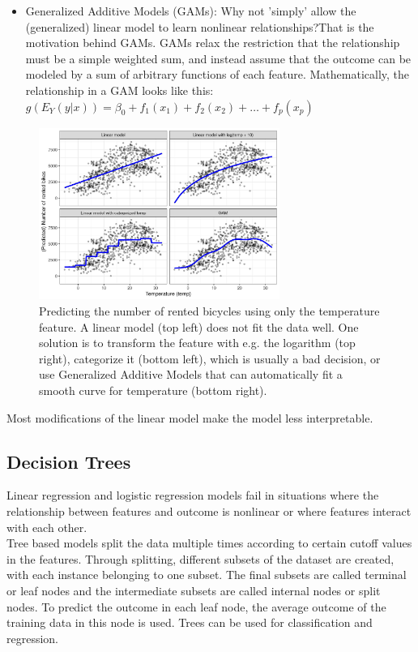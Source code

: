\begin{enumerate}
\begin{itemize}
        \item Generalized Additive Models (GAMs): Why not 'simply' allow the (generalized) linear model to learn nonlinear relationships?That is the motivation behind GAMs. GAMs relax the restriction that the relationship must be a simple weighted sum, and instead assume that the outcome can be modeled by a sum of arbitrary functions of each feature. Mathematically, the relationship in a GAM looks like this: $g(E_Y(y|x))=\beta_0+f_1(x_{1})+f_2(x_{2})+\ldots+f_p(x_{p})$
    \end{itemize}
\end{enumerate}

\begin{figure}[H]
    \includegraphics[width=0.7\textwidth]{img/nonlinear-effects-1.jpeg}
    \centering
    \caption{Predicting the number of rented bicycles using only the temperature feature. A linear model (top left) does not fit the data well. One solution is to transform the feature with e.g. the logarithm (top right), categorize it (bottom left), which is usually a bad decision, or use Generalized Additive Models that can automatically fit a smooth curve for temperature (bottom right).}
\end{figure}

Most modifications of the linear model make the model less interpretable.

\subsection{Decision Trees}
Linear regression and logistic regression models fail in situations where the relationship
between features and outcome is nonlinear or where features interact with each other.\\

Tree based models split the data multiple times according to certain cutoff values in the features. Through splitting, different subsets of the dataset are created, with each instance belonging to one subset. The final subsets are called terminal or leaf nodes and the intermediate subsets are called internal nodes or split nodes. To predict the outcome in each leaf node, the average outcome of the training data in this node is used. Trees can be used for classification and regression.\\

